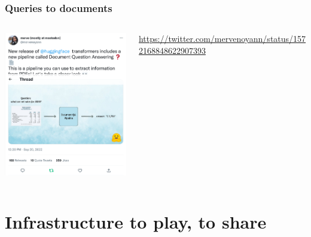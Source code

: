 \documentclass[17pt,aspectratio=169,hyperref={pdfusetitle,colorlinks,allcolors=olive}]{beamer}
\begin{document}
\begin{frame}[fragile]
  \frametitle{Queries to documents}

  \begin{columns}[T]
    \begin{column}{.58\textwidth}
      \includegraphics[width=7.5cm]{figs/pdf-extract}
    \end{column}%
    \hfill%
    \begin{column}{.38\textwidth}
      \vspace{1.5cm}
    {\scriptsize
      \url{https://twitter.com/mervenoyann/status/1572168848622907393}
    }
    \end{column}%
  \end{columns}

\end{frame}

\section{Infrastructure to play, to share}
\end{document}
